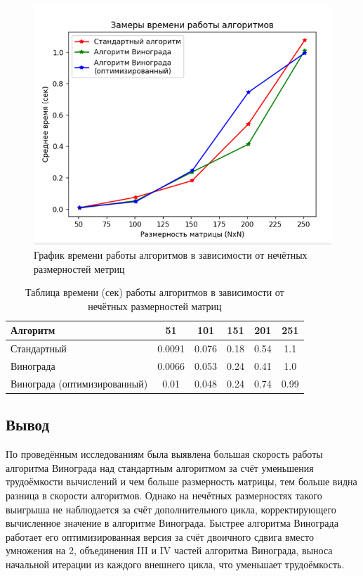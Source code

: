 \begin{figure}[H]
    \centering
    \includegraphics[width=1\textwidth]{img/graph_odd.png}
    \caption{График времени работы алгоритмов в зависимости от нечётных размерностей метриц}
    \label{fig:graph_odd} %
\end{figure}

\begin{table}[H]
    \centering
    \begin{tabular}{|l|c|c|c|c|c|}
        \hline
        \textbf{Алгоритм} & \textbf{51} & \textbf{101} & \textbf{151} & \textbf{201} & \textbf{251}\\
        \hline
        Стандартный & 0.0091 & 0.076 & 0.18 & 0.54 & 1.1 \\
        Винограда & 0.0066 & 0.053 & 0.24 & 0.41 & 1.0 \\
        Винограда (оптимизированный) & 0.01 & 0.048 & 0.24 & 0.74 & 0.99 \\
        \hline
    \end{tabular}
    \caption{Таблица времени (сек) работы алгоритмов в зависимости от нечётных размерностей матриц}
    \label{table:table_odd}
\end{table}

\subsection*{Вывод}

\hspace{1.25cm}
По проведённым исследованиям была выявлена большая скорость работы алгоритма Винограда над стандартным алгоритмом за счёт уменьшения трудоёмкости вычислений и чем больше размерность матрицы, тем больше видна разница в скорости алгоритмов. Однако на нечётных размерностях такого выигрыша не наблюдается за счёт дополнительного цикла, корректирующего вычисленное значение в алгоритме Винограда. Быстрее алгоритма Винограда работает его оптимизированная версия за счёт двоичного сдвига вместо умножения на 2, объединения III и IV частей алгоритма Винограда, выноса начальной итерации из каждого внешнего цикла, что уменьшает трудоёмкость.

\newpage